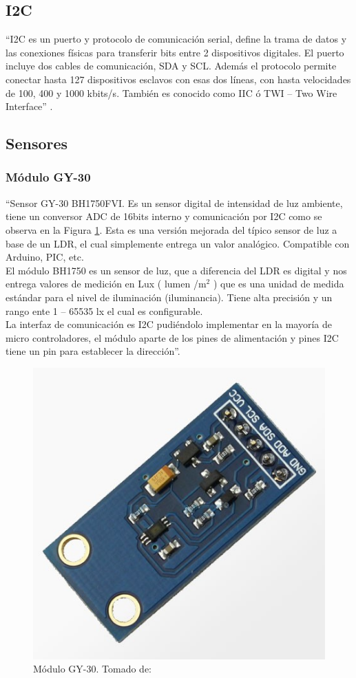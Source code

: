 \subsection{I2C}

``I2C es un puerto y protocolo de comunicación serial, define la trama de datos y las conexiones físicas para transferir bits entre 2 dispositivos digitales. El puerto incluye dos cables de comunicación, SDA y SCL. Además el protocolo permite conectar hasta 127 dispositivos esclavos con esas dos líneas, con hasta velocidades de 100, 400 y 1000 kbits/s. También es conocido como IIC ó TWI – Two Wire Interface'' \cite{I2C}.

\subsection{Sensores}\label{sec:sensors}

\subsubsection{Módulo GY-30}

``Sensor GY-30 BH1750FVI. Es un sensor digital de intensidad de luz ambiente, tiene un conversor ADC de 16bits interno y comunicación por I2C como se observa en la Figura \ref{fig:gy-30}. Esta es una versión mejorada del típico sensor de luz a base de un LDR, el cual simplemente entrega un valor analógico. Compatible con Arduino, PIC, etc. \\

El módulo BH1750 es un sensor de luz, que a diferencia del LDR es digital y nos entrega valores de medición en Lux ( lumen /m$^2$ ) que es una  unidad de medida estándar para el nivel de iluminación (iluminancia). Tiene alta precisión y un rango ente 1 – 65535 lx el cual es configurable.\\

La interfaz de comunicación es I2C pudiéndolo implementar en la mayoría de micro controladores, el módulo aparte de los pines de alimentación y pines I2C tiene un pin para establecer la dirección''.\cite{GY30}

\begin{figure}[H]
	\centering
	\caption[Módulo GY-30.]{Módulo GY-30. Tomado de: \cite{GY30}}
	\label{fig:gy-30}
	\includegraphics[width=0.4\linewidth]{Imagenes/gy-30}
\end{figure}


